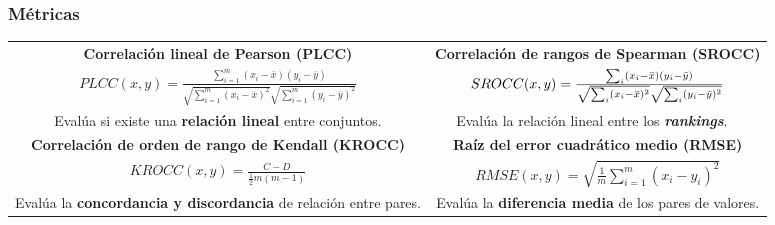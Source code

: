 \begin{frame}
  \frametitle{Métricas}
  \vspace{-.4cm}
  \begin{adjustwidth}{-.5cm}{}
  \begin{table}
      \setlength{\tabcolsep}{12pt}
  \begin{tabular}[l]{cc}
        \textbf{Correlación lineal de Pearson (PLCC)} 
        &
        \textbf{Correlación de rangos de Spearman (SROCC)} 
        \\
        \parbox[c]{6cm}{ 
   \centering
          $
  PLCC(x,y) = \frac{\sum_{i=1}^m (x_i - \bar x)(y_i - \bar y)}{\sqrt{\sum_{i=1}^m (x_i - \bar x)^2}\sqrt{\sum_{i=1}^m (y_i - \bar y)^2}}
        $ 
        \vspace{.3cm}
    }
& 
\parbox[c]{6cm}{
   \centering
   \vskip5pt
  $
  SROCC(x,y) = \frac{\sum_i (x_i - \bar x)(y_i - \bar y)}{\sqrt{\sum_i (x_i - \bar x)^2}\sqrt{\sum_i (y_i - \bar y)^2}}
        \vspace{.3cm}
$
}
\\ 
\parbox[c]{5cm}{
  \centering
  \footnotesize
    Evalúa si existe una \textbf{relación lineal} entre conjuntos. 
    \vspace{.5cm}
}
&
\parbox[c]{5cm}{
  \centering
  \footnotesize
  Evalúa la relación lineal entre los \textbf{\emph{rankings}}.
  \vspace{.5cm}
    \
}
\\
\parbox[c]{5cm}{\centering \textbf{Correlación de orden de rango de Kendall (KROCC)}}
& 
\textbf{Raíz del error cuadrático medio (RMSE)} 
\\
 \parbox[c]{5cm}{
   \centering
   \vskip5pt
   $
  KROCC(x,y) = \frac{C-D}{\frac{1}{2} m (m-1)}
    $
        \vspace{.3cm}
  }
& 
\parbox[c]{5cm}{
  \centering
  $
  RMSE(x,y) = \sqrt{\frac{1}{m}\sum_{i=1}^m (x_i - y_i)^2}
  $
}
\\
\parbox[c]{5cm}{
  \centering
  \footnotesize
    Evalúa la \textbf{concordancia y discordancia} de relación entre pares.
  }
  & 
\parbox[c]{5cm}{
  \centering
  \footnotesize
  Evalúa la \textbf{diferencia media} de los pares de valores.
   
  }
  \\

      \end{tabular}
  \end{table}
\end{adjustwidth} 
\end{frame}

